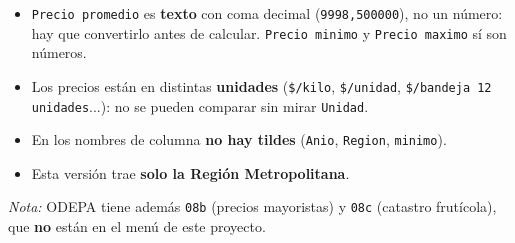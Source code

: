 \documentclass[10.5pt]{article}
\begin{document}
\begin{alertabox}
\begin{itemize}[leftmargin=1.1em,itemsep=2pt,topsep=2pt]
\item \texttt{Precio promedio} es \textbf{texto} con coma decimal (\texttt{9998,500000}), no un número: hay que convertirlo antes de calcular. \texttt{Precio minimo} y \texttt{Precio maximo} sí son números.
\item Los precios están en distintas \textbf{unidades} (\texttt{\$/\allowbreak{}kilo}, \texttt{\$/\allowbreak{}unidad}, \texttt{\$/\allowbreak{}bandeja 12 unidades}...): no se pueden comparar sin mirar \texttt{Unidad}.
\item En los nombres de columna \textbf{no hay tildes} (\texttt{Anio}, \texttt{Region}, \texttt{minimo}).
\item Esta versión trae \textbf{solo la Región Metropolitana}.
\end{itemize}
\end{alertabox}
\vspace{4pt}
{\small \emph{Nota:} ODEPA tiene además \texttt{08b} (precios mayoristas) y \texttt{08c} (catastro frutícola), que \textbf{no} están en el menú de este proyecto.}


\newpage
{}\label{base9a}\hypertarget{base9a}{}
\end{document}
